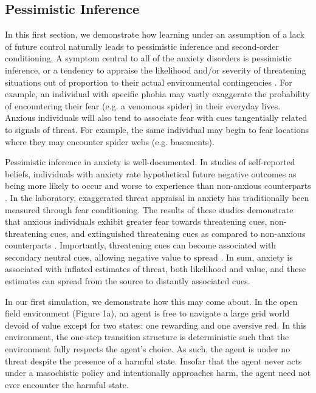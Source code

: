 \documentclass[11pt]{article} %
\begin{document}
\subsection{Pessimistic Inference}

In this first section, we demonstrate how learning under an assumption of a lack of future control naturally leads to pessimistic inference and second-order conditioning. A symptom central to all of the anxiety disorders is pessimistic inference, or a tendency to appraise the likelihood and/or severity of threatening situations out of proportion to their actual environmental contingencies \citep{dsm5, BeckClark1997, ClarkBeck2011}. For example, an individual with specific phobia may vastly exaggerate the probability of encountering their fear (e.g. a venomous spider) in their everyday lives. Anxious individuals will also tend to associate fear with cues tangentially related to signals of threat. For example, the same individual may begin to fear locations where they may encounter spider webs (e.g. basements).

Pessimistic inference in anxiety is well-documented. In studies of self-reported beliefs, individuals with anxiety rate hypothetical future negative outcomes as being more likely to occur and worse to experience than non-anxious counterparts \citep{ButlerMathews1983, ButlerMathews1987, Foa1996, MacLeod1996, MacLeod1997, Luten1997, Stober1997, Borkovec1999, Maner2006, Mitte2007, Miranda2007}. In the laboratory, exaggerated threat appraisal in anxiety has traditionally been measured through fear conditioning. The results of these studies demonstrate that anxious individuals exhibit greater fear towards threatening cues, non-threatening cues, and extinguished threatening cues as compared to non-anxious counterparts \citep{lissek2005, MinekaOehlberg2008, Duits2015}. Importantly, threatening cues can become associated with secondary neutral cues, allowing negative value to spread \citep{wessa2007}. In sum, anxiety is associated with inflated estimates of threat, both likelihood and value, and these estimates can spread from the source to distantly associated cues.

In our first simulation, we demonstrate how this may come about. In the open field environment (Figure 1a), an agent is free to navigate a large grid world devoid of value except for two states: one rewarding and one aversive red. In this environment, the one-step transition structure is deterministic such that the environment fully respects the agent's choice. As such, the agent is under no threat despite the presence of a harmful state. Insofar that the agent never acts under a masochistic policy and intentionally approaches harm, the agent need not ever encounter the harmful state.
\end{document}

